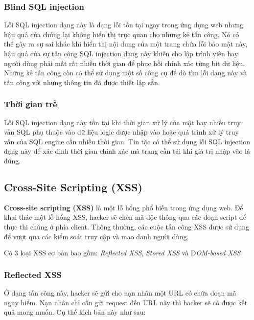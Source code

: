 \documentclass[../main-report.tex]{subfiles}
\begin{document}
\subsubsection*{Blind SQL injection}
Lỗi SQL injection dạng này là dạng lỗi tồn tại ngay trong ứng dụng web nhưng hậu quả của chúng lại không hiển thị trực quan cho những kẻ tấn công. Nó có thể gây ra sự sai khác khi hiển thị nội dung của một trang chứa lỗi bảo mật này, hậu quả của sự tấn công SQL injection dạng này khiến cho lập trình viên hay người dùng phải mất rất nhiều thời gian để phục hồi chính xác từng bit dữ liệu. Những kẻ tấn công còn có thể sử dụng một số công cụ để dò tìm lỗi dạng này và tấn công với những thông tin đã được thiết lập sẵn.

\subsubsection*{Thời gian trễ}
Lỗi SQL injection dạng này tồn tại khi thời gian xử lý của một hay nhiều truy vấn SQL phụ thuộc vào dữ liệu logic được nhập vào hoặc quá trình xử lý truy vấn của SQL engine cần nhiều thời gian. Tin tặc có thể sử dụng lỗi SQL injection dạng này để xác định thời gian chính xác mà trang cần tải khi giá trị nhập vào là đúng.
\subsection{Cross-Site Scripting (XSS)}
\textbf{Cross-site scripting (XSS)} là một lỗ hổng phổ biến trong ứng dụng web. Để khai thác một lỗ hổng XSS, hacker sẽ chèn mã độc thông qua các đoạn script để thực thi chúng ở phía client. Thông thường, các cuộc tấn công XSS được sử dụng để vượt qua các kiểm soát truy cập và mạo danh người dùng.

Có 3 loại XSS cơ bản bao gồm: \emph{Reflected XSS}, \emph{Stored XSS} và D\emph{OM-based XSS}

\subsubsection*{Reflected XSS}
Ở dạng tấn công này, hacker sẽ gửi cho nạn nhân một URL có chứa đoạn mã nguy hiểm. Nạn nhân chỉ cần gửi request đến URL này thì hacker sẽ có được kết quả mong muốn. Cụ thể kịch bản này như sau:
\end{document}
